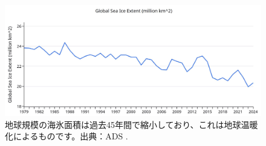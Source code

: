 \documentclass[10pt,twocolumn,letterpaper]{article}
\begin{document}
\begin{figure}[t]
\begin{center}
\includegraphics[width=1\textwidth]{ice.jpg}
\end{center}
   \caption{地球規模の海氷面積は過去45年間で縮小しており、これは地球温暖化によるものです。出典：ADS \cite{149}.}
\label{fig:24}
\end{figure}




\clearpage
\twocolumn

{\small
\renewcommand{\refname}{参考文献}


}
\end{document}
